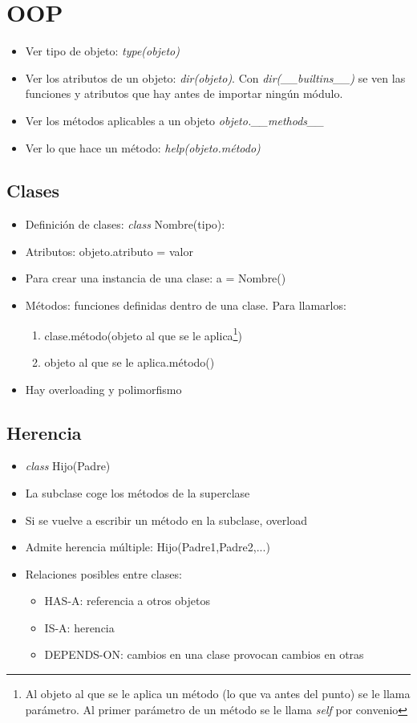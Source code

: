 \section{OOP}

	\begin{itemize}
	\item Ver tipo de objeto: \textit{type(objeto)}
	\item Ver los atributos de un objeto: \textit{dir(objeto)}. Con \textit{dir(\_\_builtins\_\_)} se ven las funciones y atributos que hay antes de importar ningún módulo.
	\item Ver los métodos aplicables a un objeto \textit{objeto.\_\_methods\_\_}
	\item Ver lo que hace un método: \textit{help(objeto.método)}
	\end{itemize}
	
	\subsection{Clases}
	\begin{itemize}
	\item Definición de clases: \textit{class} Nombre(tipo):
	\item Atributos: objeto.atributo = valor
	\item Para crear una instancia de una clase: a = Nombre()
	\item Métodos: funciones definidas dentro de una clase. Para llamarlos:
		\begin{enumerate}
		\item clase.método(objeto al que se le aplica\footnote{Al objeto al que se le aplica un método (lo que va antes del punto) se le llama parámetro. Al primer parámetro de un método se le llama \textit{self} por convenio})
		\item objeto al que se le aplica.método()
		\end{enumerate}
	\item Hay overloading y polimorfismo
	\end{itemize}

	\subsection{Herencia}
	\begin{itemize}
	\item \textit{class} Hijo(Padre)
	\item La subclase coge los métodos de la superclase
	\item Si se vuelve a escribir un método en la subclase, overload
	\item Admite herencia múltiple: Hijo(Padre1,Padre2,...)
	\item Relaciones posibles entre clases:
		\begin{itemize}
		\item HAS-A: referencia a otros objetos
		\item IS-A: herencia
		\item DEPENDS-ON: cambios en una clase provocan cambios en otras
		\end{itemize}
	\end{itemize}

